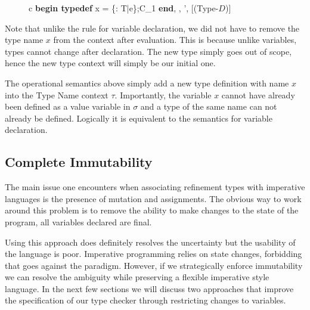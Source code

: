 \documentclass[a4paper,12pt]{report}
\begin{document}
\begin{figure}[H]
  \begin{center}
    \begin{tabular} {c}
      {\langle \textbf{begin typedef }x = \{\upsilon : T\text{ }|\text{ }e\};C_1\textbf{ end}, 
      \sigma, \tau \rangle \longrightarrow 
        \langle \sigma', \tau \rangle} [(Type-$D$)]
    \end{tabular}
  \end{center}
\end{figure}

\par
Note that unlike the rule for variable declaration, we did not have to remove 
the type name $x$ from the context after evaluation. This is because unlike 
variables, types cannot change after declaration. The new type simply goes 
out of scope, hence the new type context will simply be our initial one. 

\par
The operational semantics above simply add a new type definition with name $x$ 
into the Type Name context $\tau$. Importantly, the variable $x$ cannot have 
already been defined as a value variable in $\sigma$ and a type of the same name 
can not already be defined. Logically it is equivalent to the semantics for 
variable declaration.

\subsection{Complete Immutability}
The main issue one encounters when associating refinement types with imperative 
languages is the presence of mutation and assignments. The obvious way to 
work around this problem is to remove the ability to make changes to the state 
of the program, all variables declared are final.

\par
Using this approach does definitely resolves the uncertainty but the usability of 
the language is poor. Imperative programming relies on state changes, forbidding 
that goes against the paradigm. However, if we strategically enforce immutability 
we can resolve the ambiguity while preserving a flexible imperative style 
language. In the next few sections we will discuss two approaches that 
improve the specification of our type checker through restricting changes to 
variables. 
\end{document}

